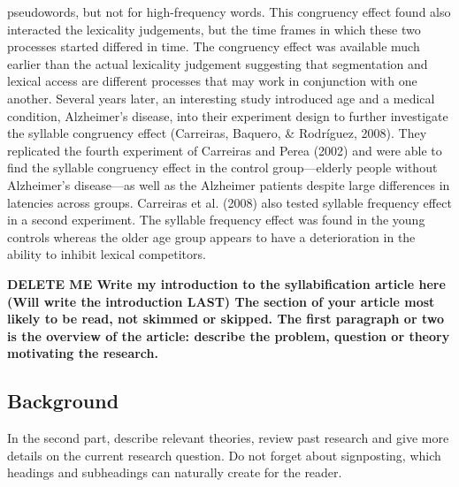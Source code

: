 pseudowords, but not for high-frequency words. This congruency effect found also interacted the lexicality judgements, but the time frames in which these two processes started differed in time. The congruency effect was available much earlier than the actual lexicality judgement suggesting that segmentation and lexical access are different processes that may work in conjunction with one another. Several years later, an interesting study introduced age and a medical condition, Alzheimer’s disease, into their experiment design to further investigate the syllable congruency effect (Carreiras, Baquero, \& Rodríguez, 2008). They replicated the fourth experiment of Carreiras and Perea (2002) and were able to find the syllable congruency effect in the control group—elderly people without Alzheimer’s disease—as well as the Alzheimer patients despite large differences in latencies across groups. Carreiras et al. (2008) also tested syllable frequency effect in a second experiment. The syllable frequency effect was found in the young controls whereas the older age group appears to have a deterioration in the ability to inhibit lexical competitors.

\textbf{DELETE ME Write my introduction to the syllabification article here (Will write the introduction LAST)
The section of your article most likely to be read, not skimmed or skipped. The first paragraph or two is the overview of the article: describe the problem, question or theory motivating the research. }

\subsection{Background}

In the second part, describe relevant theories, review past research and give more details on the current research question. Do not forget about signposting, which headings and subheadings can naturally create for the reader.


